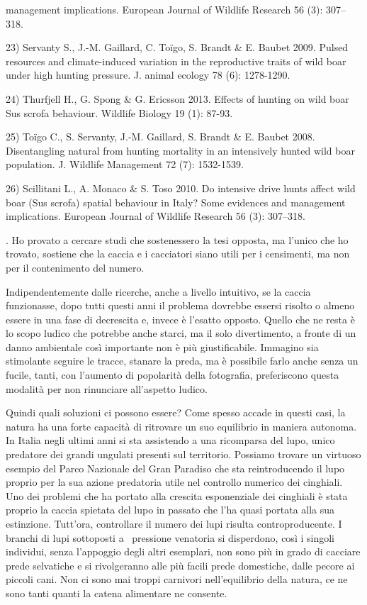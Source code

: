 \documentclass[12pt]{book} %
\begin{document}
\begin{mdframed}[linewidth=1pt]
{management implications. European Journal of Wildlife Research 56 (3): 307–318.\par 23) Servanty S., J.-M. Gaillard, C.
Toïgo, S. Brandt \& E. Baubet 2009. Pulsed resources and climate-induced variation in the reproductive traits of wild
boar under high hunting pressure. J. animal ecology 78 (6): 1278-1290.\par 24) Thurfjell H., G. Spong \& G. Ericsson
2013. Effects of hunting on wild boar Sus scrofa behaviour. Wildlife Biology 19 (1): 87-93.\par 25) Toïgo C., S.
Servanty, J.-M. Gaillard, S. Brandt \& E. Baubet 2008. Disentangling natural from hunting mortality in an intensively
hunted wild boar population. J. Wildlife Management 72 (7): 1532-1539.\par 26) Scillitani L., A. Monaco \& S. Toso
2010. Do intensive drive hunts affect wild boar (Sus scrofa) spatial behaviour in Italy? Some evidences and management
implications. European Journal of Wildlife Research 56 (3): 307–318. }. Ho provato a cercare studi che sostenessero la
tesi opposta, ma l'unico che ho trovato, sostiene che la caccia e i cacciatori siano utili per i
censimenti, ma non per il contenimento del numero. 

Indipendentemente dalle ricerche, anche a livello intuitivo, se la caccia funzionasse, dopo tutti questi anni il
problema dovrebbe essersi risolto o almeno essere in una fase di decrescita e, invece è l'esatto
opposto. Quello che ne resta è lo scopo ludico che potrebbe anche starci, ma il solo divertimento, a fronte di un danno
ambientale così importante non è più giustificabile. Immagino sia stimolante seguire le tracce, stanare la preda, ma è
possibile farlo anche senza un fucile, tanti, con l'aumento di popolarità della fotografia,
preferiscono questa modalità per non rinunciare all'aspetto ludico.

Quindi quali soluzioni ci possono essere? Come spesso accade in questi casi, la natura ha una forte capacità di
ritrovare un suo equilibrio in maniera autonoma. In Italia negli ultimi anni si sta assistendo a una ricomparsa del
lupo, unico predatore dei grandi ungulati presenti sul territorio. Possiamo trovare un virtuoso esempio del Parco
Nazionale del Gran Paradiso che sta reintroducendo il lupo proprio per la sua azione predatoria utile nel controllo
numerico dei cinghiali. Uno dei problemi che ha portato alla crescita esponenziale dei cinghiali è stata proprio la
caccia spietata del lupo in passato che l'ha quasi portata alla sua estinzione.
Tutt'ora, controllare il numero dei lupi risulta controproducente. I branchi di lupi sottoposti a
\ pressione venatoria si disperdono, così i singoli individui, senza l'appoggio degli altri
esemplari, non sono più in grado di cacciare prede selvatiche e si rivolgeranno alle più facili prede domestiche, dalle
pecore ai piccoli cani. Non ci sono mai troppi carnivori nell'equilibrio della natura, ce ne sono
tanti quanti la catena alimentare ne consente.


\end{mdframed}
\end{document}
